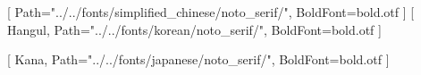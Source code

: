 \usepackage{xeCJK}
[
    Path="../../fonts/simplified_chinese/noto_serif/",
    BoldFont=bold.otf
]
[
    Hangul,
    Path="../../fonts/korean/noto_serif/",
    BoldFont=bold.otf
]

[
    Kana,
    Path="../../fonts/japanese/noto_serif/",
    BoldFont=bold.otf
]
